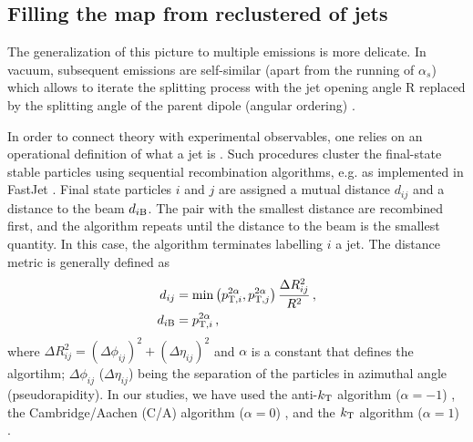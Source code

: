 

\subsection{Filling the map from reclustered of jets}
\label{sec:iterative-declustering}

The generalization of this picture to multiple emissions is more delicate. In vacuum, subsequent emissions are self-similar (apart from the running of $\alpha_s$) which allows to iterate the splitting process with the jet opening angle R replaced by the splitting angle of the parent dipole (angular ordering) \cite{Ellis:1991qj,Dokshitzer:1991wu}. 

In order to connect theory with experimental observables, one relies on an operational definition of what a jet is \cite{Salam:2009jx}. Such procedures cluster the final-state stable particles using sequential recombination algorithms, e.g. as implemented in FastJet \cite{Cacciari:2005hq,Cacciari:2011ma}. Final state particles $i$ and $j$ are assigned a mutual distance $d_{ij}$ and a distance to the beam $d_{i\rm B}$. The pair with the smallest distance are recombined first, and the algorithm repeats until the distance to the beam is the smallest quantity. In this case, the algorithm terminates labelling $i$ a jet. The distance metric is generally defined as
\begin{align}
\label{eq:JetDistanceMetric}
d_{ij} &= \min\left(p_{{\rm \tiny T},i}^{2\alpha},p_{{\rm \tiny T},j}^{2\alpha} \right) \frac{\Delta R_{ij}^2}{R^2} \,, \\
d_{i \rm B} &= p_{{\rm \tiny T},i}^{2\alpha} \,,
\end{align}
where $\Delta R_{ij}^2 = (\Delta \phi_{ij})^2 + (\Delta \eta_{ij})^2$ and $\alpha$ is a constant that defines the algortihm; $\Delta \phi_{ij}$ ($\Delta \eta_{ij}$) being the separation of the particles in azimuthal angle (pseudorapidity). In our studies, we have used the anti-$k_{\rm \tiny T}$ algorithm ($\alpha = -1$) \cite{Cacciari:2008gp}, the Cambridge/Aachen (C/A) algorithm ($\alpha = 0$) \cite{Dokshitzer:1997in,Wobisch:1998wt}, and the $k_{\rm \tiny T}$ algorithm ($\alpha = 1$) \cite{Catani:1993hr,Ellis:1993tq}.

